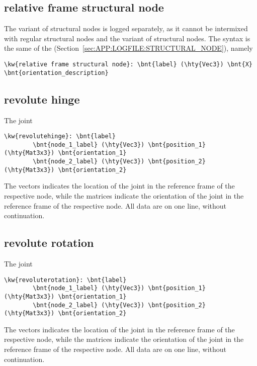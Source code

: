 \subsection{relative frame structural node}
The  variant of  structural nodes
is logged separately, as it cannot be intermixed with regular structural nodes
and the  variant of  structural nodes.
The syntax is the same of the 
(Section~\ref{sec:APP:LOGFILE:STRUCTURAL_NODE}), namely
\begin{Verbatim}[commandchars=\\\{\}]
    \kw{relative frame structural node}: \bnt{label} (\hty{Vec3}) \bnt{X} \bnt{orientation_description}
\end{Verbatim}

\subsection{revolute hinge}
The  joint
\begin{Verbatim}[commandchars=\\\{\}]
    \kw{revolutehinge}: \bnt{label}
        \bnt{node_1_label} (\hty{Vec3}) \bnt{position_1} (\hty{Mat3x3}) \bnt{orientation_1}
        \bnt{node_2_label} (\hty{Vec3}) \bnt{position_2} (\hty{Mat3x3}) \bnt{orientation_2}
\end{Verbatim}
The  vectors indicates the location of the joint
in the reference frame of the respective node,
while the  matrices indicate the orientation of the joint
in the reference frame of the respective node.
All data are on one line, without continuation.

\subsection{revolute rotation}
The  joint
\begin{Verbatim}[commandchars=\\\{\}]
    \kw{revoluterotation}: \bnt{label}
        \bnt{node_1_label} (\hty{Vec3}) \bnt{position_1} (\hty{Mat3x3}) \bnt{orientation_1}
        \bnt{node_2_label} (\hty{Vec3}) \bnt{position_2} (\hty{Mat3x3}) \bnt{orientation_2}
\end{Verbatim}
The  vectors indicates the location of the joint
in the reference frame of the respective node,
while the  matrices indicate the orientation of the joint
in the reference frame of the respective node.
All data are on one line, without continuation.

